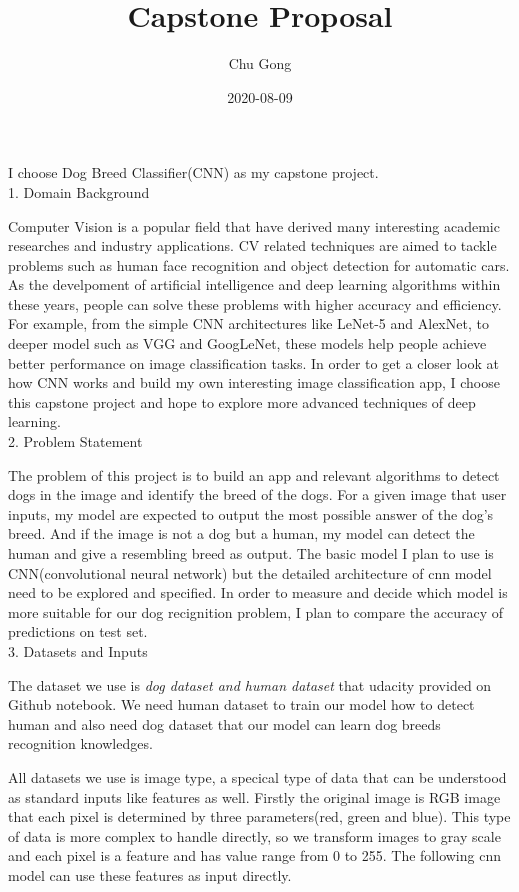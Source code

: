 \documentclass{article}
\title{Capstone Proposal}
\date{2020-08-09}
\author{Chu Gong}
\begin{document}
\maketitle

I choose Dog Breed Classifier(CNN) as my capstone project. 
\\

1. Domain Background

Computer Vision is a popular field that have derived many interesting academic researches and industry applications. CV related techniques are aimed to tackle problems such as human face recognition and object detection for automatic cars. As the develpoment of artificial intelligence and deep learning algorithms within these years, people can solve these problems with higher accuracy and efficiency. For example, from the simple CNN architectures like LeNet-5 and AlexNet, to deeper model such as VGG and GoogLeNet, these models help people achieve better performance on image classification tasks\cite{cnn_architec}. In order to get a closer look at how CNN works and build my own interesting image classification app, I choose this capstone project and hope to explore more advanced techniques of deep learning.
\\

2. Problem Statement

The problem of this project is to build an app and relevant algorithms to detect dogs in the image and identify the breed of the dogs. For a given image that user inputs, my model are expected to output the most possible answer of the dog's breed. And if the image is not a dog but a human, my model can detect the human and give a resembling breed as output\cite{project_readme}. The basic model I plan to use is CNN(convolutional neural network) but the detailed architecture of cnn model need to be explored and specified. In order to measure and decide which model is more suitable for our dog recignition problem, I plan to compare the accuracy of predictions on test set. 
\\

3. Datasets and Inputs

The dataset we use is \textit{dog dataset and human dataset} that udacity provided on Github notebook\cite{project_readme}. We need human dataset to train our model how to detect human and also need dog dataset that our model can learn dog breeds recognition knowledges. 

All datasets we use is image type, a specical type of data that can be understood as standard inputs like features as well. Firstly the original image is RGB image that each pixel is determined by three parameters(red, green and blue). This type of data is more complex to handle directly, so we transform images to gray scale and each pixel is a feature and has value range from 0 to 255. The following cnn model can use these features as input directly. 
\\
\end{document}
